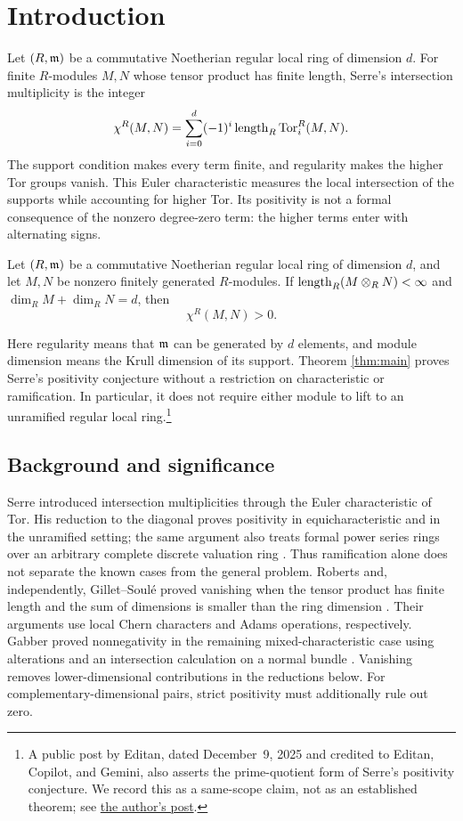 \section{Introduction}\label{sec:introduction}

Let $(R,\mathfrak{m})$ be a commutative Noetherian regular local ring of dimension
$d$. For finite $R$-modules $M,N$ whose tensor product has finite length,
Serre's intersection multiplicity is the integer
\[
  \chi^R(M,N)=\sum_{i=0}^{d}(-1)^i
       \operatorname{length}_R\operatorname{Tor}_i^R(M,N).
\]
The support condition makes every term finite, and regularity makes the
higher Tor groups vanish. This Euler characteristic measures the local
intersection of the supports while accounting for higher Tor. Its
positivity is not a formal consequence of the nonzero degree-zero term:
the higher terms enter with alternating signs.

\begin{theorem}\label{thm:main}
Let $(R,\mathfrak{m})$ be a commutative Noetherian regular local ring of dimension
$d$, and let $M,N$ be nonzero finitely generated $R$-modules. If
$\operatorname{length}_R(M\otimes_R N)<\infty$ and
$\dim_R M+\dim_R N=d$, then
\[
  \chi^R(M,N)>0.
\]
\end{theorem}

Here regularity means that $\mathfrak{m}$ can be generated by $d$ elements, and
module dimension means the Krull dimension of its support. Theorem
\ref{thm:main} proves Serre's positivity conjecture without a restriction
on characteristic or ramification. In particular, it does not require
either module to lift to an unramified regular local ring.\footnote{A
public post by Editan, dated December~9, 2025 and credited
to Editan, Copilot, and Gemini, also asserts the prime-quotient form of
Serre's positivity conjecture. We record this as a same-scope claim,
not as an established theorem; see
\href{https://note.com/editan/n/n35dec2c1ddbe}{the author's post}.}

\subsection{Background and significance}

Serre introduced intersection multiplicities through the Euler
characteristic of Tor. His reduction to the diagonal proves positivity
in equicharacteristic and in the unramified setting; the same argument
also treats formal power series rings over an arbitrary complete
discrete valuation ring \cite[Chapter~V]{Serre}. Thus ramification alone
does not separate the known cases from the general problem.
Roberts and, independently, Gillet--Soul\'e proved vanishing when the
tensor product has finite length and the sum of dimensions is smaller
than the ring dimension \cite{Roberts,RobertsRennes,GilletSoule}.
Their arguments use local Chern characters and Adams operations,
respectively. Gabber proved nonnegativity in the remaining
mixed-characteristic case using alterations and an intersection
calculation on a normal bundle
\cite[Section~6.1, Theorem~6.1.1]{Gabber}. Vanishing removes
lower-dimensional contributions in the reductions below. For
complementary-dimensional pairs, strict positivity must additionally
rule out zero.

